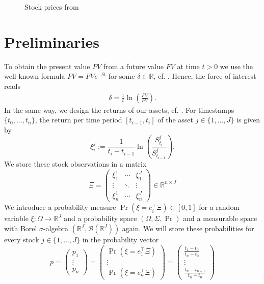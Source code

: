 \documentclass[a4paper, english, 11pt, onecolumn, oneside, final]{article}
\numberwithin{equation}{section}   %
\DeclareMathOperator{\pr}{\mathrm{Pr}}     %
\newcommand{\R}{\mathbb{R}}                 %
\theoremstyle{plain}
\theoremstyle{definition}
\theoremstyle{remark}
\begin{document}
\begin{figure}[h]
  \centering
  
  \caption{Stock prices from \cite[p.~18]{PichlerPortfoliooptimierung}}
\end{figure}
\section{Preliminaries}\label{section:Preliminaries}
To obtain the present value $PV$ from a future value $FV$ at time $t>0$ we use the well-known formula $PV = FV e^{-\delta t}$ for some $\delta\in\mathbb{R}$, cf. \citet[p.~21]{PichlerStochastischeFinanzmaerkte}. Hence, the force of interest reads
    \begin{align*}
        \delta = \frac{1}{t}\ln\left(\frac{FV}{PV}\right).
    \end{align*}
In the same way, we design the returns of our assets, cf. \citet[pp.~19-20]{PichlerPortfoliooptimierung}. For timestamps $\{t_0,\ldots,t_n\}$, the return per time period $[t_{i-1}, t_i]$ of the asset $j\in\{1,\ldots,J\}$ is given by
\begin{equation*}
    \xi_i^j := \frac{1}{t_i-t_{i-1}}\ln\left(\frac{S_{t_i}^j}{S_{t_{i-1}}^j}\right).
\end{equation*}
We store these stock observations in a matrix
\begin{equation*}
    \Xi =
    \begin{pmatrix}
        \xi_1^1 & \cdots & \xi_1^J \\
        \vdots  & \ddots & \vdots  \\
        \xi_n^1 & \cdots & \xi_n^J
    \end{pmatrix}\in\R^{n\times J}
\end{equation*}
We introduce a probability measure $\pr(\xi = e_i^\top\Xi)\in[0,1]$ for a random variable $\xi\colon\Omega\to\R^J$ and a probability space $(\Omega,\Sigma,\pr)$ and a measurable space with Borel $\sigma$-algebra $(\R^J,\mathcal{B}(\R^J))$ again. We will store these probabilities for every stock $j\in\{1,\ldots,J\}$ in the probability vector
\begin{equation*}
    p =
    \begin{pmatrix}
        p_1 \\
        \vdots \\
        p_n
    \end{pmatrix} =
    \begin{pmatrix}
        \pr(\xi = e_1^\top\Xi) \\
        \vdots \\
        \pr(\xi = e_n^\top\Xi)
    \end{pmatrix} =
    \begin{pmatrix}
        \frac{t_1-t_0}{t_n-t_0} \\
        \vdots \\
        \frac{t_n-t_{n-1}}{t_n-t_0}
    \end{pmatrix}
\end{equation*}
\end{document}
